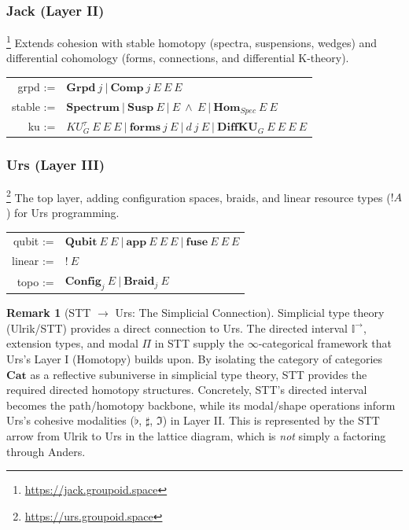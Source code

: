 \documentclass{article}
\theoremstyle{definition}
\newtheorem{remark}[definition]{Remark}
\theoremstyle{plain}
\begin{document}
\subsubsection{Jack (Layer II) \cite{schreiber13differential}}\footnote{\url{https://jack.groupoid.space}}
Extends cohesion with stable homotopy (spectra, suspensions, wedges) and differential cohomology (forms, connections, and differential K-theory).
\begin{table}[ht!]
\centering
\begin{tabular}{rl}
    grpd :=&$\textbf{Grpd}\ j\ |\ \textbf{Comp}\ j\ E\ E\ E$ \\
  stable :=&$\textbf{Spectrum}\ |\ \textbf{Susp}\ E\ |\ E\ \wedge\ E\ |\ \textbf{Hom}_{Spec}\ E\ E$ \\
      ku :=&$KU_G^{\tau}\ E\ E\ E\ |\ \textbf{forms}\ j\ E\ |\ d\ j\ E\ |\ \textbf{DiffKU}_G\ E\ E\ E\ E$ \\
\end{tabular}
\end{table}

\subsubsection{Urs (Layer III) \cite{sati2022anyonic, sati2022topological, sati2023anyonicdefect}}\footnote{\url{https://urs.groupoid.space}}
The top layer, adding configuration spaces, braids, and linear resource types ($!A$) for Urs programming.
\begin{table}[ht!]
\centering
\begin{tabular}{rl}
   qubit :=&$\textbf{Qubit}\ E\ E\ |\ \textbf{app}\ E\ E\ E\ |\ \textbf{fuse}\ E\ E\ E$ \\
  linear :=&$!\ E$ \\
    topo :=&$\textbf{Config}_j\ E\ |\ \textbf{Braid}_j\ E$ \\
\end{tabular}
\end{table}

\begin{remark}[STT $\to$ Urs: The Simplicial Connection]
Simplicial type theory (Ulrik/STT) provides a direct connection to Urs.
The directed interval $\mathbb{I}^{\to}$, extension types, and modal
$\Pi$ in STT supply the $\infty$-categorical framework that Urs's Layer I
(Homotopy) builds upon. By isolating the category of categories $\mathbf{Cat}$ as a reflective subuniverse in simplicial type theory, STT provides the required directed homotopy structures. Concretely, STT's directed interval becomes the path/homotopy backbone, while its modal/shape operations inform Urs's cohesive modalities ($\flat$, $\sharp$, $\Im$) in Layer II\@. This is represented by the $\mathrm{STT}$ arrow from Ulrik to Urs in the lattice diagram, which is \emph{not} simply a factoring through Anders.
\end{remark}
\end{document}
